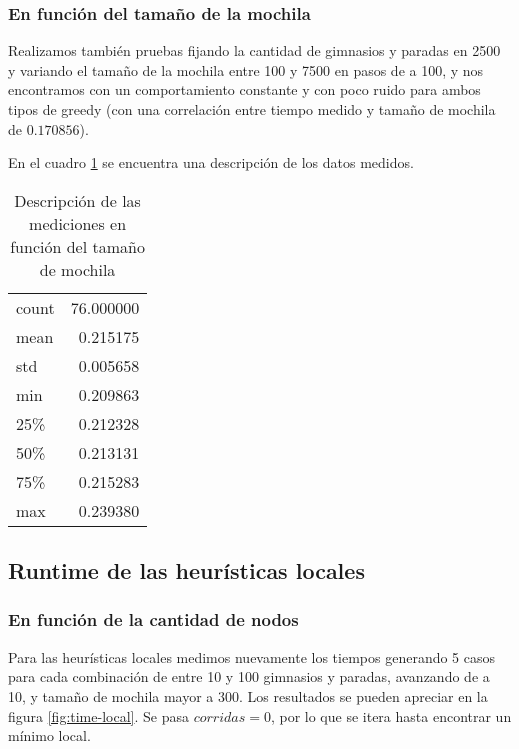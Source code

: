 \subsubsection{En función del tamaño de la mochila}

Realizamos también pruebas fijando la cantidad de gimnasios y paradas en 2500 y variando el tamaño de la mochila entre 100 y 7500 en pasos de a 100, y nos encontramos con un comportamiento constante y con poco ruido para ambos tipos de greedy (con una correlación entre tiempo medido y tamaño de mochila de $0.170856$).

En el cuadro \ref{tab:time-greedy-moch} se encuentra una descripción de los datos medidos.

\begin{table}[H]
    \begin{center}
        \begin{tabular}{ l | r }
            count  & 76.000000 \\
            mean   &  0.215175 \\
            std    &  0.005658 \\
            min    &  0.209863 \\
            25\%   &  0.212328 \\
            50\%   &  0.213131 \\
            75\%   &  0.215283 \\
            max    &  0.239380 \\
        \end{tabular}
        \caption{Descripción de las mediciones en función del tamaño de mochila}\label{tab:time-greedy-moch}
    \end{center}
\end{table}

\subsection{Runtime de las heurísticas locales}

\subsubsection{En función de la cantidad de nodos}

Para las heurísticas locales medimos nuevamente los tiempos generando 5 casos para cada combinación de entre 10 y 100 gimnasios y paradas, avanzando de a 10, y tamaño de mochila mayor a 300. Los resultados se pueden apreciar en la figura \ref{fig:time-local}. Se pasa $corridas=0$, por lo que se itera hasta encontrar un mínimo local.

